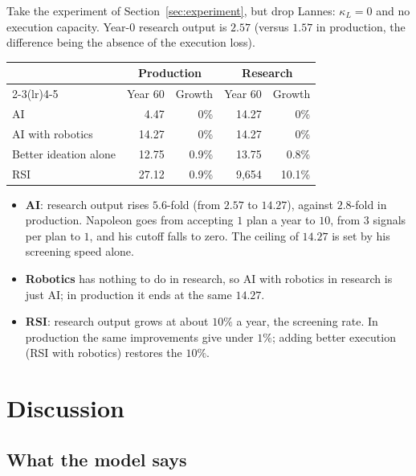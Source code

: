 \documentclass[11pt]{article}
\newcommand{\Nap}{\textcolor{nap}{Napoleon}}
\newcommand{\Lan}{\textcolor{lan}{Lannes}}
\theoremstyle{remark}
\begin{document}
Take the experiment of Section~\ref{sec:experiment}, but drop \Lan: $\kappa_L=0$ and no execution capacity. Year-0 research output is $2.57$ (versus $1.57$ in production, the difference being the absence of the execution loss).
\begin{center}
\renewcommand{\arraystretch}{1.12}
\begin{tabular}{@{}l r r r r@{}}
\toprule
& \multicolumn{2}{c}{Production} & \multicolumn{2}{c}{Research}\\
\cmidrule(lr){2-3}\cmidrule(lr){4-5}
& Year 60 & Growth & Year 60 & Growth\\
\midrule
\textcolor{ber}{AI} & 4.47 & 0\% & 14.27 & 0\%\\
\textcolor{lan}{AI with robotics} & 14.27 & 0\% & 14.27 & 0\%\\
Better ideation alone & 12.75 & 0.9\% & 13.75 & 0.8\%\\
\textcolor{nap}{RSI} & 27.12 & 0.9\% & 9{,}654 & 10.1\%\\
\bottomrule
\end{tabular}
\end{center}
\begin{itemize}
  \item \textbf{AI}: research output rises $5.6$-fold (from $2.57$ to $14.27$), against $2.8$-fold in production. \Nap{} goes from accepting $1$ plan a year to $10$, from $3$ signals per plan to $1$, and his cutoff falls to zero. The ceiling of $14.27$ is set by his screening speed alone.
  \item \textbf{Robotics} has nothing to do in research, so AI with robotics in research is just AI; in production it ends at the same $14.27$.
  \item \textbf{RSI}: research output grows at about $10\%$ a year, the screening rate. In production the same improvements give under $1\%$; adding better execution (RSI with robotics) restores the $10\%$.
\end{itemize}

\section{Discussion}

\subsection{What the model says}
\end{document}
